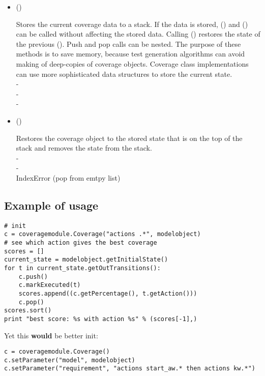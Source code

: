 \documentclass{article}
\begin{document}
\begin{itemize}
\begin{quot}
     -
  \end{quot}
\item[] ()
  \begin{quot}
    Stores the current coverage data to a stack. If the data is
    stored, () and
    () can be called without affecting the
    stored data. Calling () restores the state of the
    previous (). Push and pop calls can be
    nested. The purpose of these methods is to save memory, because
    test generation algorithms can avoid making of deep-copies of
    coverage objects. Coverage class implementations can use more
    sophisticated data structures to store the
    current state.\\
     -\\
     -\\
     -
  \end{quot}
\item[] ()
  \begin{quot}
    Restores the coverage object to the stored state that is on the
    top of the stack and removes the state from the stack.\\
     -\\
     -\\
     IndexError (pop from emtpy list)
  \end{quot}
\end{itemize}

\subsection{Example of usage}

\begin{verbatim}
# init
c = coveragemodule.Coverage("actions .*", modelobject)
# see which action gives the best coverage
scores = []
current_state = modelobject.getInitialState()
for t in current_state.getOutTransitions():
    c.push()
    c.markExecuted(t)
    scores.append((c.getPercentage(), t.getAction()))
    c.pop()
scores.sort()
print "best score: %s with action %s" % (scores[-1],)
\end{verbatim}
Yet this \textbf{would} be better init:
\begin{verbatim}
c = coveragemodule.Coverage()
c.setParameter("model", modelobject)
c.setParameter("requirement", "actions start_aw.* then actions kw.*")
\end{verbatim}
\end{document}
